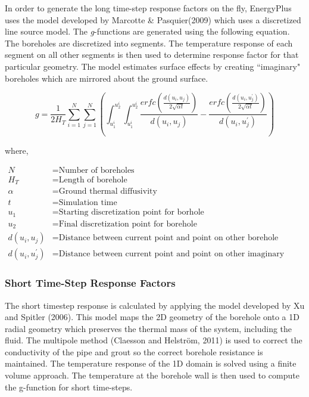 In order to generate the long time-step response factors on the fly, EnergyPlus uses the model developed by Marcotte \& Pasquier(2009) which uses a discretized line source model. The \emph{g}-functions are generated using the following equation. The boreholes are discretized into segments. The temperature response of each segment on all other segments is then used to determine response factor for that particular geometry. The model estimates surface effects by creating ``imaginary" boreholes which are mirrored about the ground surface.

\begin{equation}
g = \frac{1}{2 H_T} \sum_{i=1}^N \sum_{j=1}^N \left( \int_{u_1^i}^{u_2^i} \int_{u_1^i}^{u_2^i} \frac{erfc\left( \frac{d(u_i, u_j)}{2\sqrt{\alpha t}}\right)}{d(u_i, u_j)} - \frac{erfc\left( \frac{d(u_i, u_j^{'})}{2\sqrt{\alpha t}}\right)}{d(u_i, u_j^{'})}\right)
\end{equation}

where,

\begin{align}
	N &= \mbox{Number of boreholes} \\
	H_T &= \mbox{Length of borehole} \\
	\alpha &= \mbox{Ground thermal diffusivity} \\
	t &= \mbox{Simulation time} \\
	u_1 &= \mbox{Starting discretization point for borhole} \\
	u_2 &= \mbox{Final discretization point for borehole} \\
	d(u_i, u_j) &= \mbox{Distance between current point and point on other borehole} \\
	d(u_i, u_j^{'}) &= \mbox{Distance between current point and point on other imaginary borehole}
\end{align}


\subsubsection{Short Time-Step Response Factors}\label{short-time-step-response-factors}

The short timestep response is calculated by applying the model developed by Xu and Spitler (2006). This model maps the 2D geometry of the borehole onto a 1D radial geometry which preserves the thermal mass of the system, including the fluid. The multipole method (Claesson and Helstr{\"o}m, 2011) is used to correct the conductivity of the pipe and grout so the correct borehole resistance is maintained. The temperature response of the 1D domain is solved using a finite volume approach. The temperature at the borehole wall is then used to compute the g-function for short time-steps.

